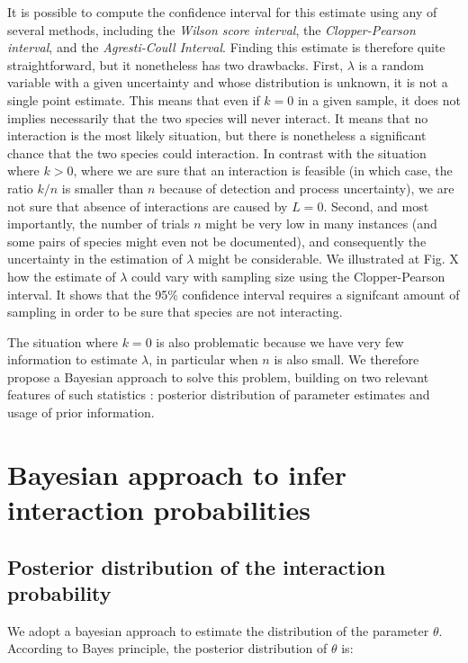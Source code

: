 \documentclass[12pt]{article}
\begin{document}
It is possible to compute the confidence interval for this estimate using any of several methods, including the \emph{Wilson score interval}, the \emph{Clopper-Pearson interval}, and the \emph{Agresti-Coull Interval}. Finding this estimate is therefore quite straightforward, but it nonetheless has two drawbacks. First, $\lambda$ is a random variable with a given uncertainty and whose distribution is unknown, it is not a single point estimate. This means that even if $k = 0$ in a given sample, it does not implies necessarily that the two species will never interact. It means that no interaction is the most likely situation, but there is nonetheless a significant chance that the two species could interaction. In contrast with the situation where $k>0$, where we are sure that an interaction is feasible (in which case, the ratio $k/n$ is smaller than $n$ because of detection and process uncertainty), we are not sure that absence of interactions are caused by $L=0$. Second, and most importantly, the number of trials $n$ might be very low in many instances (and some pairs of species might even not be documented), and consequently the uncertainty in the estimation of $\lambda$ might be considerable. We illustrated at Fig. X how the estimate of $\lambda$ could vary with sampling size using the Clopper-Pearson interval. It shows that the 95\% confidence interval requires a signifcant amount of sampling in order to be sure that species are not interacting. 

The situation where $k = 0$ is also problematic because we have very few information to estimate $\lambda$, in particular when $n$ is also small. We therefore propose a Bayesian approach to solve this problem, building on two relevant features of such statistics : posterior distribution of parameter estimates and usage of prior information. 

\section*{Bayesian approach to infer interaction probabilities}

    \subsection*{Posterior distribution of the interaction probability}

  We adopt a bayesian approach to estimate the distribution of the parameter $\theta$. According to Bayes principle, the posterior distribution of $\theta$ is:
\end{document}
